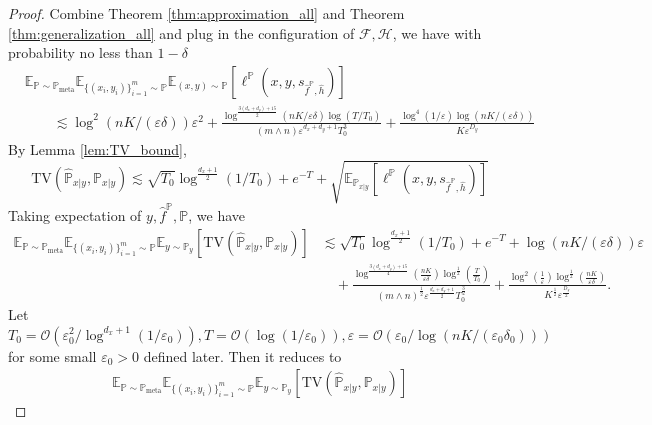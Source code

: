 \documentclass{article}
\numberwithin{equation}{section}
\newcommand{\E}{\mathbb{E}}
\theoremstyle{definition}
\newcommand{\Pmeta}{\mathbb{P}_{\text{meta}}}
\renewcommand{\P}{\mathbb{P}}
\begin{document}
\begin{proof}
    Combine Theorem \ref{thm:approximation_all} and Theorem \ref{thm:generalization_all} and plug in the configuration of $\mathcal{F},\mathcal{H}$, we have with probability no less than $1-\delta$
    \begin{equation}
        \begin{aligned}
            &\E_{\P\sim\Pmeta}\E_{\{(x_i,y_i)\}_{i=1}^m\sim \P} \E_{(x,y)\sim\P} [\ell^\P(x,y,s_{\widehat{f}^\P,\widehat{h}})] \\
            &\qquad \lesssim 
            \log^2(nK/(\varepsilon\delta))\varepsilon^2+\frac{\log^{\frac{3(d_x+d_y)+15}{2}}(nK/\varepsilon\delta)\log(T/T_0)}{(m\wedge n)\varepsilon^{d_x+d_y+1}T_0^3}+\frac{\log^4(1/\varepsilon)\log(nK/(\varepsilon\delta))}{K\varepsilon^{D_y}}
        \end{aligned}
    \end{equation}
    By Lemma \ref{lem:TV_bound},
    \begin{equation}
        \mathrm{TV}(\widehat{\P}_{x|y},\P_{x|y})
        \lesssim \sqrt{T_0}\log^{\frac{d_x+1}{2}}(1/T_0)+e^{-T}+\sqrt{\E_{\P_{x|y}}[\ell^{\P}(x,y,s_{\widehat{f}^\P,\widehat{h}})]}
    \end{equation}
    Taking expectation of $y,\widehat{f}^\P,\P$, we have
    \begin{equation}
        \begin{aligned}
            \E_{\P\sim\Pmeta}\E_{\{(x_i,y_i)\}_{i=1}^m\sim \P}\E_{y\sim\P_y} [\mathrm{TV}(\widehat{\P}_{x|y},\P_{x|y})]
            &\lesssim \sqrt{T_0}\log^{\frac{d_x+1}{2}}(1/T_0)+e^{-T} + \log(nK/(\varepsilon\delta))\varepsilon \\
            &\quad +\frac{\log^{\frac{3(d_x+d_y)+15}{4}}(\frac{nK}{\varepsilon\delta})\log^{\frac{1}{2}}(\frac{T}{T_0})}{(m\wedge n)^{\frac{1}{2}}\varepsilon^{\frac{d_x+d_y+1}{2}}T_0^{\frac{3}{2}}}+\frac{\log^2(\frac{1}{\varepsilon})\log^{\frac{1}{2}}(\frac{nK}{\varepsilon\delta})}{K^{\frac{1}{2}}\varepsilon^{\frac{D_y}{2}}}.
        \end{aligned}
    \end{equation}
    Let $T_0=\mathcal{O}\left(\varepsilon_0^2/\log^{d_x+1}(1/\varepsilon_0)\right), T=\mathcal{O}(\log(1/\varepsilon_0)), \varepsilon=\mathcal{O}(\varepsilon_0/\log(nK/(\varepsilon_0\delta_0)))$ for some small $\varepsilon_0>0$ defined later.
    Then it reduces to
    \begin{equation}
        \begin{aligned}
            \E_{\P\sim\Pmeta}\E_{\{(x_i,y_i)\}_{i=1}^m\sim \P}\E_{y\sim\P_y} [\mathrm{TV}(\widehat{\P}_{x|y},\P_{x|y})]

\end{aligned}
\end{equation}
\end{proof}
\end{document}
